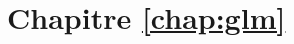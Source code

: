 \section*{Chapitre \ref{chap:glm}}

\begin{solution}{2.1}

\end{solution}
\begin{solution}{2.2}

\end{solution}
\begin{solution}{2.3}

\end{solution}
\begin{solution}{2.4}

\end{solution}
\begin{solution}{2.5}

\end{solution}
\begin{solution}{2.6}

\end{solution}
\begin{solution}{2.7}

\end{solution}
\begin{solution}{2.8}

\end{solution}
\begin{solution}{2.9}

\end{solution}

